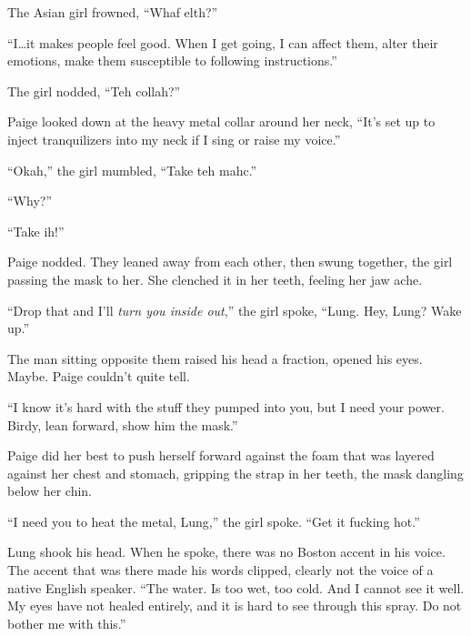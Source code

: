 The Asian girl frowned, ``Whaf elth?''



``I\ldots it makes people feel good.  When I get going, I can affect them, alter their emotions, make them susceptible to following instructions.''



The girl nodded, ``Teh collah?''



Paige looked down at the heavy metal collar around her neck, ``It's set up to inject tranquilizers into my neck if I sing or raise my voice.''



``Okah,'' the girl mumbled, ``Take teh mahc.''



``Why?''



``Take ih!''



Paige nodded.  They leaned away from each other, then swung together, the girl passing the mask to her.  She clenched it in her teeth, feeling her jaw ache.



``Drop that and I'll \emph{turn you inside out},'' the girl spoke, ``Lung.  Hey, Lung?  Wake up.''



The man sitting opposite them raised his head a fraction, opened his eyes.  Maybe.  Paige couldn't quite tell.



``I know it's hard with the stuff they pumped into you, but I need your power.  Birdy, lean forward, show him the mask.''



Paige did her best to push herself forward against the foam that was layered against her chest and stomach, gripping the strap in her teeth, the mask dangling below her chin.



``I need you to heat the metal, Lung,'' the girl spoke.  ``Get it fucking hot.''



Lung shook his head.  When he spoke, there was no Boston accent in his voice.  The accent that was there made his words clipped, clearly not the voice of a native English speaker.  ``The water.  Is too wet, too cold.  And I cannot see it well.  My eyes have not healed entirely, and it is hard to see through this spray.  Do not bother me with this.''



